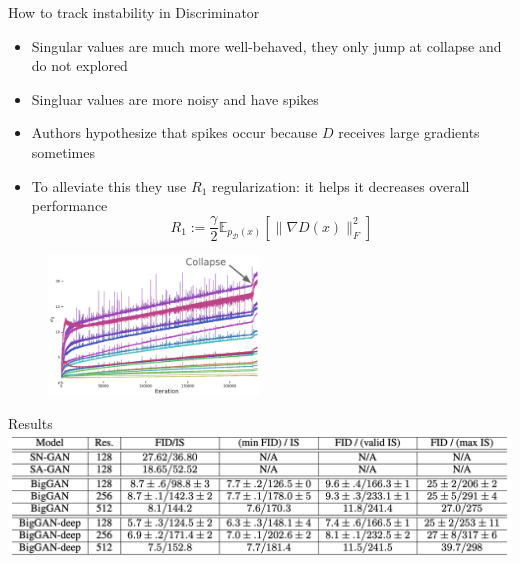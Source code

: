 \documentclass[handout, 10pt]{beamer}
\begin{document}
\begin{frame}{How to track instability in Discriminator}
    \begin{itemize}
        \item\pause Singular values are much more well-behaved, they only jump at collapse and do not explored
        \item\pause Singluar values are more noisy and have spikes
        \item\pause Authors hypothesize that spikes occur because $D$ receives large gradients sometimes
        \item\pause To alleviate this they use $R_1$ regularization: it helps it decreases overall performance
        \begin{equation}
            R_{1}:=\frac{\gamma}{2} \mathbb{E}_{p_{\mathcal{D}}(x)}\left[\|\nabla D(x)\|_{F}^{2}\right]
        \end{equation}
    \end{itemize}
    
    \begin{figure}
        \centering
        \includegraphics[width=0.5\textwidth]{images/biggan-singular-values-discriminator}
    \end{figure}
\end{frame}

\begin{frame}{Results}
    \centering
    \includegraphics[width=\textwidth]{images/biggan-results}
\end{frame}
\end{document}
